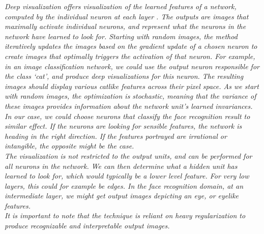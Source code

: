 \textit{Deep visualization offers visualization of the learned features of a network, computed by the individual neuron at each layer \cite{deepvis, deepvis_web}. The outputs are images that maximally activate individual neurons, and represent what the neurons in the network have learned to look for. Starting with random images, the method iteratively updates the images based on the gradient update of a chosen neuron to create images that optimally triggers the activation of that neuron. For example, in an image classification network, we could use the output neuron responsible for the class ‘cat’, and produce deep visualizations for this neuron. The resulting images should display various catlike features across their pixel space. As we start with random images, the optimization is stochastic, meaning that the variance of these images provides information about the network unit’s learned invariances. In our case, we could choose neurons that classify the face recognition result to similar effect. If the neurons are looking for sensible features, the network is heading in the right direction. If the features portrayed are irrational or intangible, the opposite might be the case.} \\ 

\noindent \textit{The visualization is not restricted to the output units, and can be performed for all neurons in the network. We can then determine what a hidden unit has learned to look for, which would typically be a lower level feature. For very low layers, this could for example be edges. In the face recognition domain, at an intermediate layer, we might get output images depicting an eye, or eyelike features.} \\

\noindent \textit{It is important to note that the technique is reliant on heavy regularization to produce recognizable and interpretable output images.}

\cleardoublepage